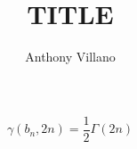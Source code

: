 \documentclass[a4paper,11pt]{article}
\author{Anthony Villano}
\title{TITLE}
\begin{document}
\maketitle



\huge
\begin{equation}
	\gamma(b_n,2n) = \frac{1}{2}\Gamma(2n) 
\end{equation}
\end{document}

